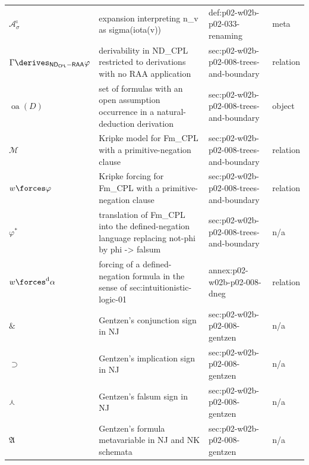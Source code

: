 \begin{longtable}{@{}p{}p{}p{}p{}@{}}
\(\mathcal A_{\sigma}^{\iota}\) & expansion interpreting n\_v as sigma(iota(v)) & def:\allowbreak{}p02-\allowbreak{}w02b-\allowbreak{}p02-\allowbreak{}033-\allowbreak{}renaming & meta \\
\(\Gamma\derives_{\mathsf{ND}_{\mathsf{CPL}}-\mathsf{RAA}}\varphi\) & derivability in ND\_CPL restricted to derivations with no RAA application & sec:\allowbreak{}p02-\allowbreak{}w02b-\allowbreak{}p02-\allowbreak{}008-\allowbreak{}trees-\allowbreak{}and-\allowbreak{}boundary & relation \\
\(\operatorname{oa}(D)\) & set of formulas with an open assumption occurrence in a natural-deduction derivation & sec:\allowbreak{}p02-\allowbreak{}w02b-\allowbreak{}p02-\allowbreak{}008-\allowbreak{}trees-\allowbreak{}and-\allowbreak{}boundary & object \\
\(\mathcal M\) & Kripke model for Fm\_CPL with a primitive-negation clause & sec:\allowbreak{}p02-\allowbreak{}w02b-\allowbreak{}p02-\allowbreak{}008-\allowbreak{}trees-\allowbreak{}and-\allowbreak{}boundary & relation \\
\(w\forces\varphi\) & Kripke forcing for Fm\_CPL with a primitive-negation clause & sec:\allowbreak{}p02-\allowbreak{}w02b-\allowbreak{}p02-\allowbreak{}008-\allowbreak{}trees-\allowbreak{}and-\allowbreak{}boundary & relation \\
\(\varphi^{\ast}\) & translation of Fm\_CPL into the defined-negation language replacing not-phi by phi -> falsum & sec:\allowbreak{}p02-\allowbreak{}w02b-\allowbreak{}p02-\allowbreak{}008-\allowbreak{}trees-\allowbreak{}and-\allowbreak{}boundary & n/a \\
\(w\forces^{\mathrm d}\alpha\) & forcing of a defined-negation formula in the sense of sec:intuitionistic-logic-01 & annex:\allowbreak{}p02-\allowbreak{}w02b-\allowbreak{}p02-\allowbreak{}008-\allowbreak{}dneg & relation \\
\(\&\) & Gentzen's conjunction sign in NJ & sec:\allowbreak{}p02-\allowbreak{}w02b-\allowbreak{}p02-\allowbreak{}008-\allowbreak{}gentzen & n/a \\
\(\supset\) & Gentzen's implication sign in NJ & sec:\allowbreak{}p02-\allowbreak{}w02b-\allowbreak{}p02-\allowbreak{}008-\allowbreak{}gentzen & n/a \\
\(\curlywedge\) & Gentzen's falsum sign in NJ & sec:\allowbreak{}p02-\allowbreak{}w02b-\allowbreak{}p02-\allowbreak{}008-\allowbreak{}gentzen & n/a \\
\(\mathfrak A\) & Gentzen's formula metavariable in NJ and NK schemata & sec:\allowbreak{}p02-\allowbreak{}w02b-\allowbreak{}p02-\allowbreak{}008-\allowbreak{}gentzen & n/a \\

\end{longtable}
